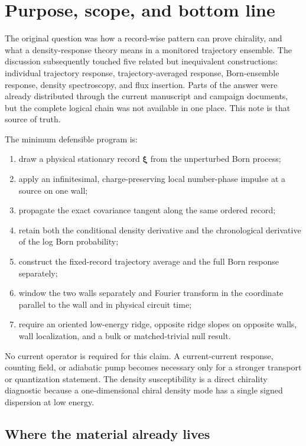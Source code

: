 \documentclass[aps,prb,onecolumn,nofootinbib,superscriptaddress]{revtex4-2}
\newcommand{\bxi}{\bm{\xi}}
\begin{document}
\section{Purpose, scope, and bottom line}
\label{sec:purpose}

The original question was how a record-wise pattern can prove chirality, and
what a density-response theory means in a monitored trajectory ensemble.  The
discussion subsequently touched five related but inequivalent constructions:
individual trajectory response, trajectory-averaged response, Born-ensemble
response, density spectroscopy, and flux insertion.  Parts of the answer were
already distributed through the current manuscript and campaign documents, but
the complete logical chain was not available in one place.  This note is that
source of truth.

The minimum defensible program is:
\begin{enumerate}
  \item draw a physical stationary record $\bxi$ from the unperturbed Born
  process;
  \item apply an infinitesimal, charge-preserving local number-phase impulse at
  a source on one wall;
  \item propagate the exact covariance tangent along the same ordered record;
  \item retain both the conditional density derivative and the chronological
  derivative of the log Born probability;
  \item construct the fixed-record trajectory average and the full Born
  response separately;
  \item window the two walls separately and Fourier transform in the coordinate
  parallel to the wall and in physical circuit time;
  \item require an oriented low-energy ridge, opposite ridge slopes on opposite
  walls, wall localization, and a bulk or matched-trivial null result.
\end{enumerate}

No current operator is required for this claim.  A current-current response,
counting field, or adiabatic pump becomes necessary only for a stronger
transport or quantization statement.  The density susceptibility is a direct
chirality diagnostic because a one-dimensional chiral density mode has a
single signed dispersion at low energy.

\subsection{Where the material already lives}
\end{document}
